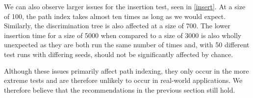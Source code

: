 We can also observe larger issues for the insertion test, seen in \cref{insert}. At a size of 100, the path index takes almost ten times as long as we would expect. Similarly, the discrimination tree is also affected at a size of 700. The lower insertion time for a size of 5000 when compared to a size of 3000 is also wholly unexpected as they are both run the same number of times and, with 50 different test runs with differing seeds, should not be significantly affected by chance.

Although these issues primarily affect path indexing, they only occur in the more extreme tests and are therefore unlikely to occur in real-world applications. We therefore believe that the recommendations in the previous section still hold.
